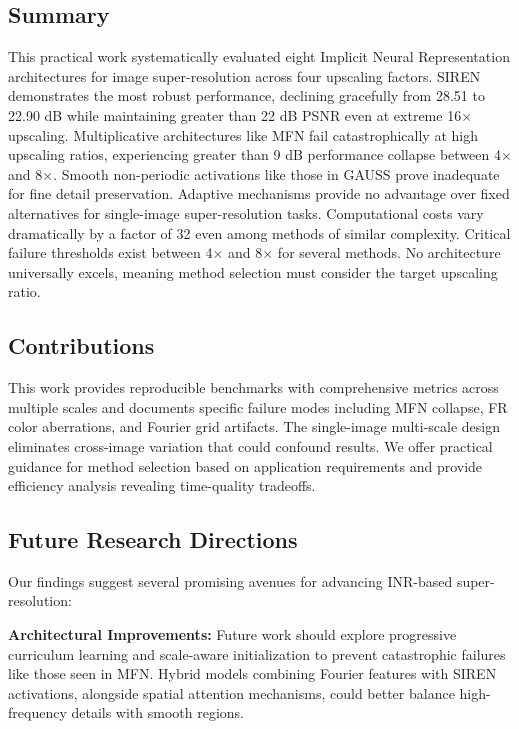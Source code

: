 \documentclass[a4paper,oneside,10pt,ngerman,english]{scrartcl}
\begin{document}
\subsection{Summary}

This practical work systematically evaluated eight Implicit Neural Representation architectures for image super-resolution across four upscaling factors. SIREN demonstrates the most robust performance, declining gracefully from 28.51 to 22.90 dB while maintaining greater than 22 dB PSNR even at extreme 16$\times$ upscaling. Multiplicative architectures like MFN fail catastrophically at high upscaling ratios, experiencing greater than 9 dB performance collapse between 4$\times$ and 8$\times$. Smooth non-periodic activations like those in GAUSS prove inadequate for fine detail preservation. Adaptive mechanisms provide no advantage over fixed alternatives for single-image super-resolution tasks. Computational costs vary dramatically by a factor of 32 even among methods of similar complexity. Critical failure thresholds exist between 4$\times$ and 8$\times$ for several methods. No architecture universally excels, meaning method selection must consider the target upscaling ratio.

\subsection{Contributions}

This work provides reproducible benchmarks with comprehensive metrics across multiple scales and documents specific failure modes including MFN collapse, FR color aberrations, and Fourier grid artifacts. The single-image multi-scale design eliminates cross-image variation that could confound results. We offer practical guidance for method selection based on application requirements and provide efficiency analysis revealing time-quality tradeoffs.

\subsection{Future Research Directions}

Our findings suggest several promising avenues for advancing INR-based super-resolution:

\textbf{Architectural Improvements:} Future work should explore progressive curriculum learning and scale-aware initialization to prevent catastrophic failures like those seen in MFN. Hybrid models combining Fourier features with SIREN activations, alongside spatial attention mechanisms, could better balance high-frequency details with smooth regions.
    
\end{document}
